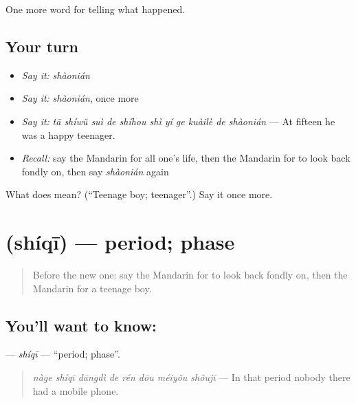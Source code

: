 \begin{grammarlens}[title={What you've built}]
One more word for telling what happened.
\end{grammarlens}

\subsection*{Your turn}
\begin{itemize}
\raggedright
  \item \emph{Say it:} \emph{shàonián}
  \item \emph{Say it:} \emph{shàonián}, once more
  \item \emph{Say it:} \emph{tā shíwǔ suì de shíhou shì yí ge kuàilè de shàonián} — At fifteen he was a happy teenager.
  \item \emph{Recall:} say the Mandarin for all one's life, then the Mandarin for to look back fondly on, then say \emph{shàonián} again
\end{itemize}

\begin{tcolorbox}[breakable,colback=teal!4,colframe=teal!35!black,title={Before you move on}]
What does  mean? (\textquotedblleft{}Teenage boy; teenager\textquotedblright{}.) Say it once more.
\end{tcolorbox}
\section[\texorpdfstring{\zh{时期} (shíqī)}{时期 (shíqī)}]{ (shíqī) — period; phase}

\label{lesson:ZH-C323-shiqi}



\begin{quote}
Before the new one: say the Mandarin for to look back fondly on, then the Mandarin for a teenage boy.
\end{quote}

\subsection*{You'll want to know: }
\textbf{} — \emph{shíqī} — \textquotedblleft{}period; phase\textquotedblright{}.

\begin{quote}
\textbf{} \emph{nàge shíqī dāngdì de rén dōu méiyǒu shǒujī} — In that period nobody there had a mobile phone.
\end{quote}

